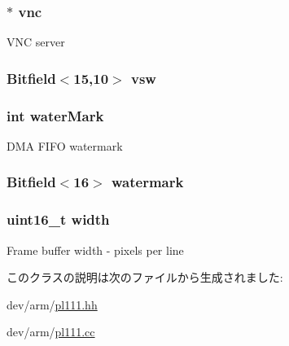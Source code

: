 \label{classPl111_ae4f40002505b03a4890ef738817b9cc1}
\hypertarget{classPl111_a52d1b5d3426a30e18a452cd67d87ec13}{
\subsubsection[{vnc}]{$\ast$ {\bf vnc}}}
\label{classPl111_a52d1b5d3426a30e18a452cd67d87ec13}
VNC server \hypertarget{classPl111_aabfa1a418a1d961d706322ca00849cdc}{
\subsubsection[{vsw}]{\setlength{\rightskip}{0pt plus 5cm}Bitfield$<$15,10$>$ {\bf vsw}}}
\label{classPl111_aabfa1a418a1d961d706322ca00849cdc}
\hypertarget{classPl111_a9741d287c1526a377487fb3a078a17dd}{
\subsubsection[{waterMark}]{\setlength{\rightskip}{0pt plus 5cm}int {\bf waterMark}}}
\label{classPl111_a9741d287c1526a377487fb3a078a17dd}
DMA FIFO watermark \hypertarget{classPl111_a7abe404e6aebfe792ff7ed7a28f74eae}{
\subsubsection[{watermark}]{\setlength{\rightskip}{0pt plus 5cm}Bitfield$<$16$>$ {\bf watermark}}}
\label{classPl111_a7abe404e6aebfe792ff7ed7a28f74eae}
\hypertarget{classPl111_ad0eab1042455a2067c812ab8071d5376}{
\subsubsection[{width}]{\setlength{\rightskip}{0pt plus 5cm}uint16\_\-t {\bf width}}}
\label{classPl111_ad0eab1042455a2067c812ab8071d5376}
Frame buffer width -\/ pixels per line 

このクラスの説明は次のファイルから生成されました:\begin{DoxyCompactItemize}
\item 
dev/arm/\hyperlink{pl111_8hh}{pl111.hh}\item 
dev/arm/\hyperlink{pl111_8cc}{pl111.cc}\end{DoxyCompactItemize}
